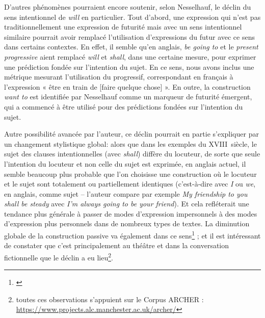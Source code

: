 D’autres phénomènes pourraient encore soutenir, selon Nesselhauf, le déclin du sens intentionnel de \textit{will} en particulier. Tout d'abord, une expression qui n’est pas traditionnellement une expression de futurité mais avec un sens intentionnel similaire pourrait avoir remplacé l'utilisation d'expressions du futur avec ce sens dans certains contextes. En effet, il semble qu'en anglais, \textit{be going to} et le \textit{present progressive} aient remplacé \textit{will} et \textit{shall}, dans une certaine mesure, pour exprimer une prédiction fondée sur l'intention du sujet. En ce sens, nous avons inclus une métrique mesurant l'utilisation du progressif, correspondant en français à l’expression « être en train de [faire quelque chose] ». En outre, la construction \textit{want to} est identifiée par Nesselhauf comme un marqueur de futurité émergent, qui a commencé à être utilisé pour des prédictions fondées sur l'intention du sujet.

Autre possibilité avancée par l'auteur, ce déclin pourrait en partie s’expliquer par un changement stylistique global: alors que dans les exemples du XVIII\ieme ~siècle, le sujet des clauses intentionnelles (avec \textit{shall}) diffère du locuteur, de sorte que seule l'intention du locuteur et non celle du sujet est exprimée, en anglais actuel, il semble beaucoup plus probable que l'on choisisse une construction où le locuteur et le sujet sont totalement ou partiellement identiques (c'est-à-dire avec \textit{I} ou \textit{we}, en anglais, comme sujet – l’auteur compare par exemple \textit{My friendship to you shall be steady} avec \textit{I'm always going to be your friend}). Et cela refléterait une tendance plus générale à passer de modes d'expression impersonnels à des modes d'expression plus personnels dans de nombreux types de textes. La diminution globale de la construction passive va également dans ce sens\footnote{\cite{leech_change_nodate}} ; et il est intéressant de constater que c'est principalement au théâtre et dans la conversation fictionnelle que le déclin a eu lieu\footnote{toutes ces observations s'appuient sur le Corpus ARCHER : \url{https://www.projects.alc.manchester.ac.uk/archer/}}.


